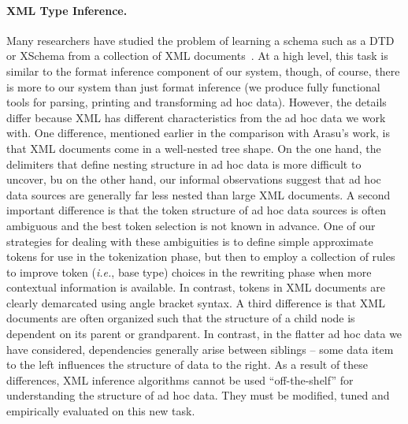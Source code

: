 \paragraph*{XML Type Inference.}
Many researchers have studied the problem of learning
a schema such as a DTD or XSchema from a collection 
of XML documents~\cite{fernau:learning-xml,garofalakis+:xtract,bex+:inferring-xml-schema,bex+:dtd-inference}.  At a high level, this task is similar
to the format inference 
component of our system, though, of course, there is more
to our system than just format inference (we produce fully 
functional tools for parsing, printing and transforming ad hoc data).  
However, the details differ because
XML has different characteristics from the ad hoc data we
work with.  One difference, mentioned earlier in the comparison with
Arasu's work, is that XML documents come in a well-nested tree
shape.  On the one hand, the delimiters that define nesting
structure in ad hoc data is more difficult to uncover, bu on the other hand,
our informal observations suggest that ad hoc data sources are generally
far less nested than large XML documents.  A second important difference
is that the token structure of ad hoc data sources is often ambiguous and
the best token selection is not known in advance.  
One of our strategies for dealing with
these ambiguities is to define simple approximate tokens for use
in the tokenization phase, but then to employ a collection of 
rules to improve token ({\em i.e.}, base type) choices in the rewriting phase
when more contextual information is available.  In contrast,
tokens in XML documents are clearly demarcated using angle bracket syntax.
A third difference is that XML documents are often organized such that
the structure of a child node is dependent on its parent or grandparent.
In contrast, in the flatter ad hoc data we have considered, dependencies
generally arise between siblings -- some data item to the left influences
the structure of data to the right.  As a result of these differences,
XML inference algorithms cannot be used ``off-the-shelf'' for understanding
the structure of ad hoc data.  They must be modified, tuned and
empirically evaluated on this new task.

